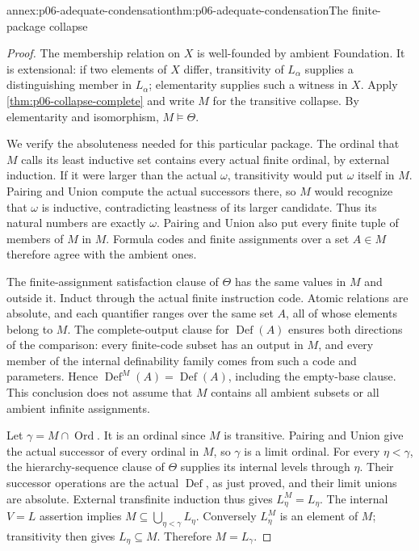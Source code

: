 \begin{annexitem}{annex:p06-adequate-condensation}{thm:p06-adequate-condensation}{The finite-package collapse}
\begin{proof}
The membership relation on \(X\) is well-founded by ambient Foundation.
It is extensional: if two elements of \(X\) differ, transitivity
of \(L_\alpha\) supplies a distinguishing member in \(L_\alpha\);
elementarity supplies such a witness in \(X\).
Apply \cref{thm:p06-collapse-complete} and write \(M\) for the
transitive collapse. By elementarity and isomorphism,
\(M\models\Theta\).

We verify the absoluteness needed for this particular package.
The ordinal that \(M\) calls its least inductive set contains
every actual finite ordinal, by external induction.
If it were larger than the actual \(\omega\), transitivity
would put \(\omega\) itself in \(M\).
Pairing and Union compute the actual successors there, so
\(M\) would recognize that \(\omega\) is inductive,
contradicting leastness of its larger candidate.
Thus its natural numbers are exactly \(\omega\).
Pairing and Union also put every finite tuple of members
of \(M\) in \(M\). Formula codes and finite assignments over
a set \(A\in M\) therefore agree with the ambient ones.

The finite-assignment satisfaction clause of \(\Theta\)
has the same values in \(M\) and outside it.
Induct through the actual finite instruction code.
Atomic relations are absolute, and each quantifier ranges
over the same set \(A\), all of whose elements belong to \(M\).
The complete-output clause for \(\operatorname{Def}(A)\)
ensures both directions of the comparison:
every finite-code subset has an output in \(M\), and
every member of the internal definability family comes
from such a code and parameters.
Hence
\(\operatorname{Def}^M(A)=\operatorname{Def}(A)\),
including the empty-base clause.
This conclusion does not assume that \(M\) contains all
ambient subsets or all ambient infinite assignments.

Let \(\gamma=M\cap\operatorname{Ord}\).
It is an ordinal since \(M\) is transitive.
Pairing and Union give the actual successor of every
ordinal in \(M\), so \(\gamma\) is a limit ordinal.
For every \(\eta<\gamma\), the hierarchy-sequence clause
of \(\Theta\) supplies its internal levels through \(\eta\).
Their successor operations are the actual \(\operatorname{Def}\),
as just proved, and their limit unions are absolute.
External transfinite induction thus gives
\(L_\eta^M=L_\eta\).
The internal \(V=L\) assertion implies
\(M\subseteq\bigcup_{\eta<\gamma}L_\eta\).
Conversely \(L_\eta^M\) is an element of \(M\);
transitivity then gives \(L_\eta\subseteq M\).
Therefore \(M=L_\gamma\).


\end{proof}
\end{annexitem}
